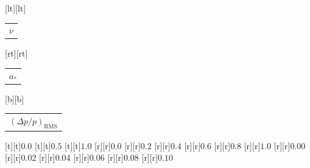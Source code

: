%    
%
%
\begin{psfrags}%
\psfragscanon%
%
[lt][lt]{\color[rgb]{0,0,0}\setlength{\tabcolsep}{0pt}\begin{tabular}{l}{\Large$\nu$}\end{tabular}}%
[rt][rt]{\color[rgb]{0,0,0}\setlength{\tabcolsep}{0pt}\begin{tabular}{r}{\Large$a_\ast$}\end{tabular}}%
[b][b]{\color[rgb]{0,0,0}\setlength{\tabcolsep}{0pt}\begin{tabular}{c}{\Large$(\Delta p/p)_{\mathrm{RMS}}$}\end{tabular}}%
%
[t][t]{$0.0$}%
[t][t]{$0.5$}%
[t][t]{$1.0$}%
%
[r][r]{$0.0$}%
[r][r]{$0.2$}%
[r][r]{$0.4$}%
[r][r]{$0.6$}%
[r][r]{$0.8$}%
[r][r]{$1.0$}%
%
[r][r]{$0.00$}%
[r][r]{$0.02$}%
[r][r]{$0.04$}%
[r][r]{$0.06$}%
[r][r]{$0.08$}%
[r][r]{$0.10$}%
%
%
\end{psfrags}%
%
